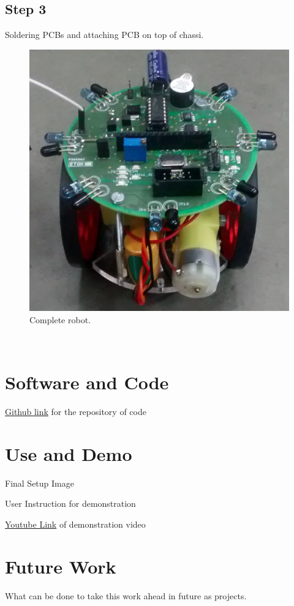 \documentclass[a4paper,12pt,oneside]{book}
\begin{document}
\subsection*{Step 3}
Soldering PCBs and attaching PCB on top of chassi.
\hfill\\
\begin{figure}[h!]
	\caption{Complete robot.}
	\includegraphics[width=\textwidth]{./Pictures/version2_top}		
\end{figure}	
\hfill\\
\newpage
\section{Software and Code}
\href{https://github.com/eYSIP-2017/eYSIP-2017_DistributedRobotics.git}{Github link} for the repository of code

\section{Use and Demo}
Final Setup Image

User Instruction for demonstration

\href{http://www.youtube.com}{Youtube Link} of demonstration video 

\section{Future Work}
What can be done to take this work ahead in future as projects.
\end{document}
